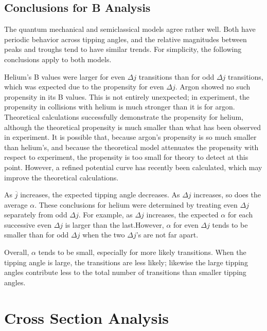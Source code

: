 \documentclass[letterpaper,titlepage,12pt]{article}
\begin{document}
\subsection{Conclusions for B Analysis}
The quantum mechanical and semiclassical models agree rather well.  Both have
periodic behavior across tipping angles, and the relative magnitudes between
peaks and troughs tend to have similar trends.  For simplicity, the following
conclusions apply to both models.

Helium's B values were larger for even $\Delta j$ transitions than for odd
$\Delta j$ transitions, which was expected due to the propensity for even
$\Delta j$.  Argon showed no such propensity in its B values.  This is not
entirely unexpected; in experiment, the propensity in collisions with helium is
much stronger than it is for argon.  Theoretical calculations successfully
demonstrate the propensity for helium, although the theoretical propensity is
much smaller than what has been observed in experiment.  It is possible that,
because argon's propensity is so much smaller than helium's, and because the
theoretical model attenuates the propensity with respect to experiment, the
propensity is too small for theory to detect at this point.  However, a refined
potential curve has recently been calculated, which may improve the theoretical
calculations.

As $\overline j$ increases, the expected tipping angle decreases.  As $\Delta
j$ increases, so does the average $\alpha$.  These conclusions for helium were
determined by treating even $\Delta j$ separately from odd $\Delta j$. For
example, as $\Delta j$ increases, the expected $\alpha$ for each successive
even $\Delta j$ is larger than the last.However, $\alpha$ for even $\Delta j$
tends to be smaller than for odd $\Delta j$ when the two $\Delta j$'s are not
far apart.

Overall, $\alpha$ tends to be small, especially for more likely transitions.
When the tipping angle is large, the transitions are less likely; likewise the
large tipping angles contribute less to the total number of transitions than
smaller tipping angles.

\clearpage
\section{Cross Section Analysis}
\end{document}

